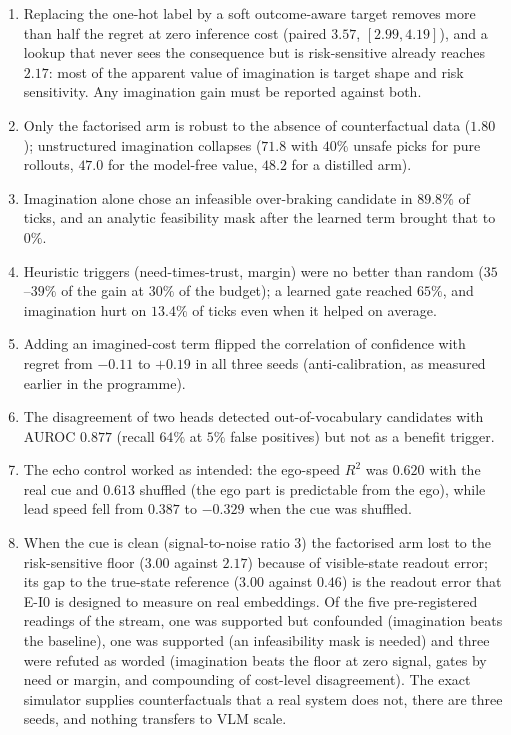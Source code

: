 \begin{enumerate}[label=(\roman*),leftmargin=2em]
\item Replacing the one-hot label by a soft outcome-aware target removes more than half the regret at zero inference cost (paired $3.57$, $[2.99,4.19]$), and a lookup that never sees the consequence but is risk-sensitive already reaches $2.17$: most of the apparent value of imagination is target shape and risk sensitivity. Any imagination gain must be reported against both.
\item Only the factorised arm is robust to the absence of counterfactual data ($1.80$); unstructured imagination collapses ($71.8$ with $40\%$ unsafe picks for pure rollouts, $47.0$ for the model-free value, $48.2$ for a distilled arm).
\item Imagination alone chose an infeasible over-braking candidate in $89.8\%$ of ticks, and an analytic feasibility mask after the learned term brought that to $0\%$.
\item Heuristic triggers (need-times-trust, margin) were no better than random ($35$--$39\%$ of the gain at $30\%$ of the budget); a learned gate reached $65\%$, and imagination hurt on $13.4\%$ of ticks even when it helped on average.
\item Adding an imagined-cost term flipped the correlation of confidence with regret from $-0.11$ to $+0.19$ in all three seeds (anti-calibration, as measured earlier in the programme).
\item The disagreement of two heads detected out-of-vocabulary candidates with AUROC $0.877$ (recall $64\%$ at $5\%$ false positives) but not as a benefit trigger.
\item The echo control worked as intended: the ego-speed $R^2$ was $0.620$ with the real cue and $0.613$ shuffled (the ego part is predictable from the ego), while lead speed fell from $0.387$ to $-0.329$ when the cue was shuffled.
\item When the cue is clean (signal-to-noise ratio $3$) the factorised arm lost to the risk-sensitive floor ($3.00$ against $2.17$) because of visible-state readout error; its gap to the true-state reference ($3.00$ against $0.46$) is the readout error that E-I0 is designed to measure on real embeddings.
Of the five pre-registered readings of the stream, one was supported but confounded (imagination beats the baseline), one was supported (an infeasibility mask is needed) and three were refuted as worded (imagination beats the floor at zero signal, gates by need or margin, and compounding of cost-level disagreement). The exact simulator supplies counterfactuals that a real system does not, there are three seeds, and nothing transfers to VLM scale.
\end{enumerate}

